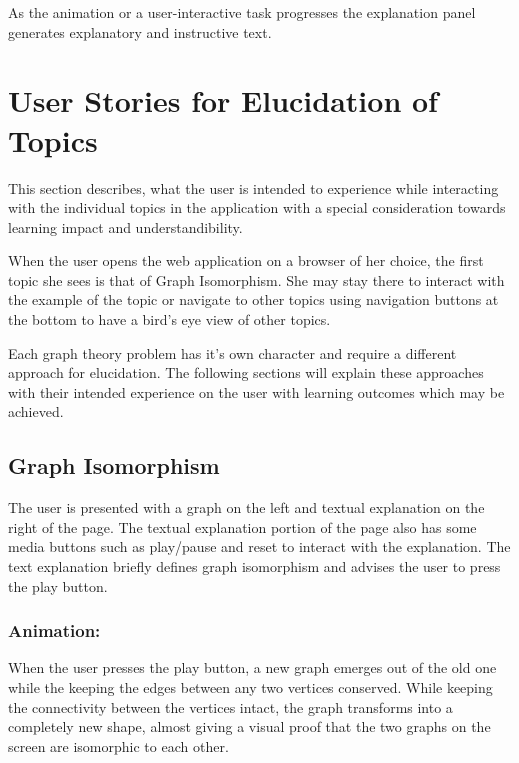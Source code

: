 As the animation or a user-interactive task progresses the explanation panel
generates explanatory and instructive text.

\section{User Stories for Elucidation of Topics}

This section describes, what the user is intended to experience while
interacting with the individual topics in the application with a special
consideration towards learning impact and understandibility.

When the user opens the web application on a browser of her choice, the first
topic she sees is that of Graph Isomorphism. She may stay there to interact
with the example of the topic or navigate to other topics using navigation
buttons at the bottom to have a bird's eye view of other topics.

Each graph theory problem has it's own character and require a different
approach for elucidation. The following sections will explain these approaches
with their intended experience on the user with learning outcomes which may be
achieved.


\subsection{Graph Isomorphism}
The user is presented with a graph on the left and textual explanation on the right of the page.
The textual explanation portion of the page also has some media buttons such as play/pause and reset
to interact with the explanation.
The text explanation briefly defines graph isomorphism and advises
the user to press the play button.

\subsubsection{Animation:}
When the user presses the play button, a new graph emerges out of the old one
while the keeping the edges between any two vertices conserved. While keeping
the connectivity between the vertices intact, the graph transforms into a
completely new shape, almost giving a visual proof that the two graphs on the
screen are isomorphic to each other.

